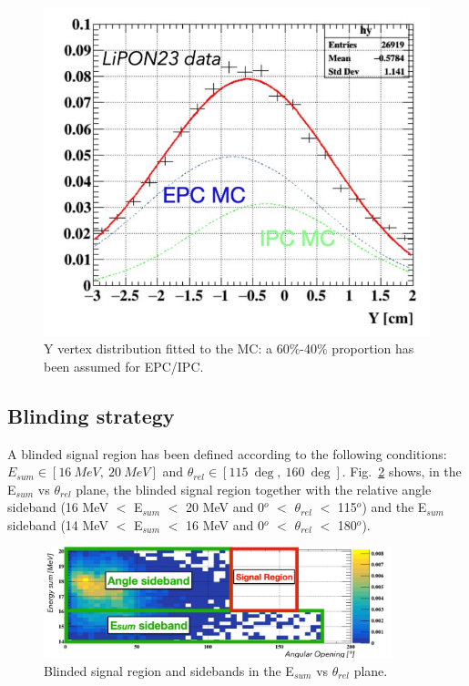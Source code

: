 \begin{refsection}
        \begin{figure}[]
            \centering
            \includegraphics[scale=0.5]{Figures/X17/Analysis/BeamSpotFit.pdf}
            \caption[X17: beam y position]{Y vertex distribution fitted to the MC: a 60$\%$-40$\%$ proportion has been assumed for EPC/IPC.}
            \label{fig:beamspotfit}
        \end{figure}

    \subsection{Blinding strategy}\label{sec:blind}
    A blinded signal region has been defined according to the following conditions: $E_{sum}\in[\SI{16}{MeV},\ \SI{20}{MeV}]$ and $\theta_{rel}\in[\SI{115}{\deg},\ \SI{160}{\deg}]$.
    Fig.~\ref{fig:regions} shows, in the E$_{sum}$ vs $\theta_{rel}$ plane, the blinded signal region together with the relative angle sideband (16 MeV $<$ E$_{sum}$ $<$ 20 MeV and 0$^o$ $<$ $\theta_{rel}$ $<$ 115$^o$) and the E$_{sum}$ sideband (14 MeV $<$ E$_{sum}$ $<$ 16 MeV and 0$^o$ $<$ $\theta_{rel}$ $<$ 180$^o$).
    \begin{figure}[htbp]
        \centering
        \includegraphics[width = 0.9\textwidth]{Figures/X17/Analysis/Regions.pdf}  
        \caption[X17: Blinded region and sidebands]{Blinded signal region and sidebands in the E$_{sum}$ vs $\theta_{rel}$ plane.}
         \label{fig:regions}
    \end{figure}


\end{refsection}
